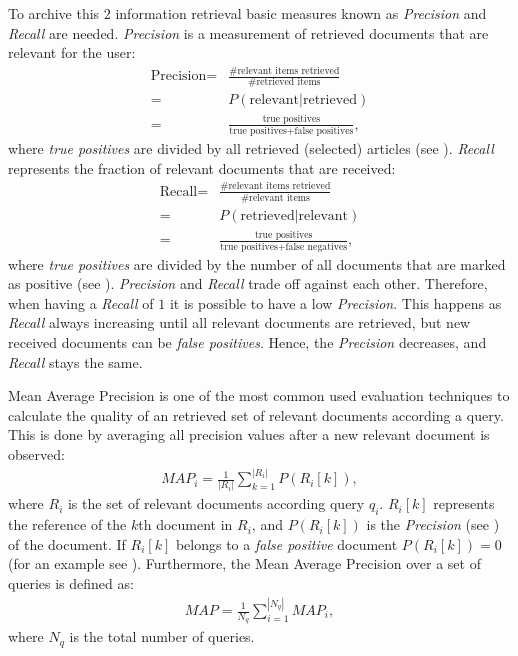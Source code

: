 To archive this $2$ information retrieval basic measures known as \textit{Precision} and \textit{Recall} are needed. \textit{Precision} is a measurement of retrieved documents that are relevant for the user:
\begin{align}
  \label{precision}
  \text{Precision} = & \frac{\text{\# relevant items retrieved}}{\text{\# retrieved items}} \nonumber \\
    = & P(\text{relevant} | \text{retrieved}) \nonumber \\
    = & \frac{\text{true positives}}{\text{true positives} + \text{false positives}},
\end{align}
where \textit{true positives} are divided by all retrieved (selected) articles (see ). \textit{Recall} represents the fraction of relevant documents that are received: 
\begin{align}
  \text{Recall} = & \frac{\text{\# relevant items retrieved}}{\text{\# relevant items}} \nonumber \\
    = & P(\text{retrieved} | \text{relevant}) \nonumber \\
    = & \frac{\text{true positives}}{\text{true positives} + \text{false negatives}},
\end{align}
where \textit{true positives} are divided by the number of all documents that are marked as positive (see ). \textit{Precision} and \textit{Recall} trade off against each other. Therefore, when having a \textit{Recall} of $1$ it is possible to have a low \textit{Precision}. This happens as \textit{Recall} always increasing until all relevant documents are retrieved, but new received documents can be \textit{false positives}. Hence, the \textit{Precision} decreases, and \textit{Recall} stays the same.

Mean Average Precision is one of the most common used evaluation techniques to calculate the quality of an retrieved set of relevant documents according a query. This is done by averaging all precision values after a new relevant document is observed: 
\begin{align}
  \label{map_of_a_single_query}
  \mathit{MAP}_i = \frac{1}{|R_i|}\sum_{k = 1}^{|R_i|} P(R_i[k]),
\end{align}
where $R_i$ is the set of relevant documents according query $q_i$. $R_i[k]$ represents the reference of the $k$th document in $R_i$, and $P(R_i[k])$ is the \textit{Precision} (see ) of the document. If $R_i[k]$ belongs to a \textit{false positive} document $P(R_i[k]) = 0$ (for an example see ). Furthermore, the Mean Average Precision over a set of queries is defined as:
\begin{align}
  \mathit{MAP} = \frac{1}{N_q}\sum_{i = 1}^{|N_q|} \mathit{MAP}_i,
\end{align}
where $N_q$ is the total number of queries.


